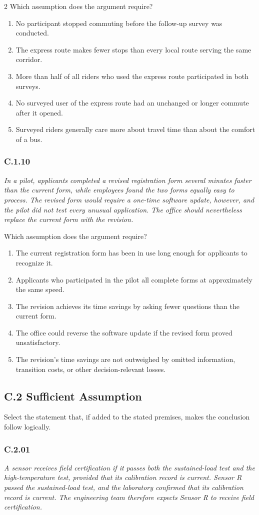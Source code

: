 \documentclass[10pt]{extarticle}
\newcommand{\choice}[1]{\item #1}
\newcommand{\bankitem}[1]{\subsubsection*{#1}}
\begin{document}
\begin{multicols}{2}
Which assumption does the argument require?
\begin{enumerate}[label=(\alph*)]
  \choice{No participant stopped commuting before the follow-up survey was conducted.}
  \choice{The express route makes fewer stops than every local route serving the same corridor.}
  \choice{More than half of all riders who used the express route participated in both surveys.}
  \choice{No surveyed user of the express route had an unchanged or longer commute after it opened.}
  \choice{Surveyed riders generally care more about travel time than about the comfort of a bus.}
\end{enumerate}
\bankitem{C.1.10}
\emph{In a pilot, applicants completed a revised registration form several minutes faster than the current form, while employees found the two forms equally easy to process. The revised form would require a one-time software update, however, and the pilot did not test every unusual application. The office should nevertheless replace the current form with the revision.}

Which assumption does the argument require?
\begin{enumerate}[label=(\alph*)]
  \choice{The current registration form has been in use long enough for applicants to recognize it.}
  \choice{Applicants who participated in the pilot all complete forms at approximately the same speed.}
  \choice{The revision achieves its time savings by asking fewer questions than the current form.}
  \choice{The office could reverse the software update if the revised form proved unsatisfactory.}
  \choice{The revision's time savings are not outweighed by omitted information, transition costs, or other decision-relevant losses.}
\end{enumerate}
\subsection*{C.2 Sufficient Assumption}
Select the statement that, if added to the stated premises, makes the conclusion follow logically.
\bankitem{C.2.01}
\emph{A sensor receives field certification if it passes both the sustained-load test and the high-temperature test, provided that its calibration record is current. Sensor R passed the sustained-load test, and the laboratory confirmed that its calibration record is current. The engineering team therefore expects Sensor R to receive field certification.}


\end{multicols}
\end{document}
